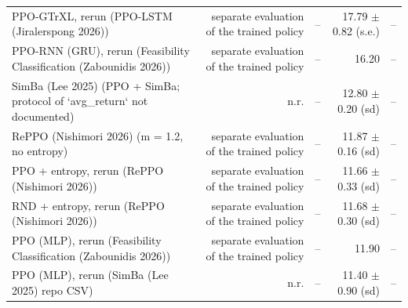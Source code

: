 \begin{tabular}{lrrrr}
PPO-GTrXL, rerun (PPO-LSTM (Jiralerspong 2026)) & separate evaluation of the trained policy & -- & 17.79 $\pm$ 0.82 (s.e.) & -- \\
PPO-RNN (GRU), rerun (Feasibility Classification (Zabounidis 2026)) & separate evaluation of the trained policy & -- & 16.20 & -- \\
SimBa (Lee 2025) (PPO + SimBa; protocol of `avg\_return` not documented) & n.r. & -- & 12.80 $\pm$ 0.20 (sd) & -- \\
RePPO (Nishimori 2026) (m = 1.2, no entropy) & separate evaluation of the trained policy & -- & 11.87 $\pm$ 0.16 (sd) & -- \\
PPO + entropy, rerun (RePPO (Nishimori 2026)) & separate evaluation of the trained policy & -- & 11.66 $\pm$ 0.33 (sd) & -- \\
RND + entropy, rerun (RePPO (Nishimori 2026)) & separate evaluation of the trained policy & -- & 11.68 $\pm$ 0.30 (sd) & -- \\
PPO (MLP), rerun (Feasibility Classification (Zabounidis 2026)) & separate evaluation of the trained policy & -- & 11.90 & -- \\
PPO (MLP), rerun (SimBa (Lee 2025) repo CSV) & n.r. & -- & 11.40 $\pm$ 0.90 (sd) & -- \\
\bottomrule
\end{tabular}
